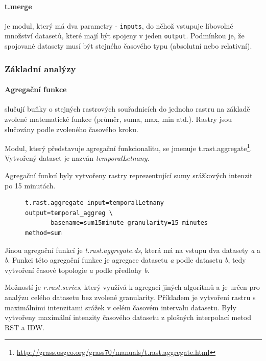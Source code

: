 \documentclass[a4paper,12pt,oneside]{report}
\begin{document}
\paragraph*{t.merge} je modul, který má dva parametry -
\texttt{inputs}, do něhož vstupuje libovolné množství datasetů, které
mají být spojeny v jeden \texttt{output}. Podmínkou je, že spojované
datasety musí být stejného časového typu (absolutní nebo relativní).


\subsubsection{Základní analýzy}
\label{subsubsec:casoprostoranal} 


\paragraph{Agregační funkce} slučují buňky o stejných rastrových
souřadnicích do jednoho rastru na základě zvolené matematické funkce
(průměr, suma, max, min atd.). Rastry jsou slučovány podle zvoleného
časového kroku.

Modul, který představuje agregační funkcionalitu, se jmenuje
t.rast.aggregate\footnote{\url{http://grass.osgeo.org/grass70/manuals/t.rast.aggregate.html}}.
Vytvořený dataset je nazván \emph{temporalLetnany}.

Agregační funkcí byly vytvořeny rastry reprezentující sumy srážkových
intenzit po 15 minutách.
\begin{figure}[h!]
\begin{footnotesize}
\lstset{extendedchars=false,
escapeinside=''}
\begin{lstlisting}[style=mybash]
t.rast.aggregate input=temporalLetnany output=temporal_aggreg \
       basename=sum15minute granularity=15 minutes method=sum
\end{lstlisting}
\end{footnotesize} 
\end{figure}

Jinou agregační funkcí je \textit{t.rast.aggregate.ds}, která má na
vstupu dva datasety \emph{a} a \emph{b}. Funkci této agregační funkce
je agregace datasetu \emph{a} podle datasetu \emph{ b}, tedy vytvoření
časové topologie \emph{a} podle předlohy \emph{b}.

Možností je \textit{r.rast.series}, který využívá k agregaci jiných
algoritmů a je určen pro analýzu celého datasetu bez zvolené
granularity.  Příkladem je vytvoření rastru s maximálními intenzitami
srážek v celém časovém intervalu datasetu. Byly vytvořeny maximální
intenzity časového datasetu z plošných interpolací metod RST a IDW.
\end{document}
